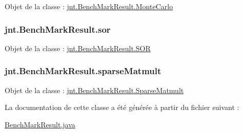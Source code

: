 Objet de la classe \-: \hyperlink{classjnt_1_1BenchMarkResult_1_1MonteCarlo}{jnt.\-Bench\-Mark\-Result.\-Monte\-Carlo} \hypertarget{classjnt_1_1BenchMarkResult_a159025733607bd514927639795a47971}{
\subsubsection[{sor}]{ jnt.\-Bench\-Mark\-Result.\-sor}}\label{classjnt_1_1BenchMarkResult_a159025733607bd514927639795a47971}
Objet de la classe \-: \hyperlink{classjnt_1_1BenchMarkResult_1_1SOR}{jnt.\-Bench\-Mark\-Result.\-S\-O\-R} \hypertarget{classjnt_1_1BenchMarkResult_abd6ec31f144598923f60d2cc0040df95}{
\subsubsection[{sparse\-Matmult}]{ jnt.\-Bench\-Mark\-Result.\-sparse\-Matmult}}\label{classjnt_1_1BenchMarkResult_abd6ec31f144598923f60d2cc0040df95}
Objet de la classe \-: \hyperlink{classjnt_1_1BenchMarkResult_1_1SparseMatmult}{jnt.\-Bench\-Mark\-Result.\-Sparse\-Matmult} 

La documentation de cette classe a été générée à partir du fichier suivant \-:\begin{DoxyCompactItemize}
\item 
\hyperlink{BenchMarkResult_8java}{Bench\-Mark\-Result.\-java}\end{DoxyCompactItemize}
